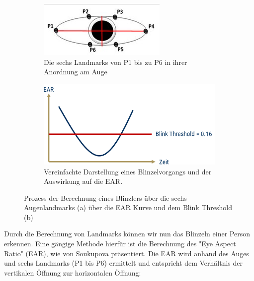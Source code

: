 \begin{figure}
    \centering
    \begin{subfigure}{0.45\textwidth}
        \includegraphics[width=\linewidth]{images/EyeLandmarks.jpg}
        \caption{Die sechs Landmarks von P1 bis zu P6 in ihrer Anordnung am Auge \cite{DE22}}
        \label{fig:eyelandmarks}
    \end{subfigure}
    \hfill
    \begin{subfigure}{0.45\textwidth}
        \includegraphics[width=\linewidth]{images/EARCurve.png}
        \caption{Vereinfachte Darstellung eines Blinzelvorgangs und der Auswirkung auf die EAR.}
        \label{fig:earcurve}
    \end{subfigure}
    \caption{Prozess der Berechnung eines Blinzlers über die sechs Augenlandmarks (a) über die EAR Kurve und dem Blink Threshold (b)}
    \label{fig:eyeaspectratio}
\end{figure}

Durch die Berechnung von Landmarks können wir nun das Blinzeln einer Person erkennen. Eine gängige Methode hierfür ist die Berechnung des "Eye Aspect Ratio" (EAR), wie von Soukupova \cite{SO16} präsentiert. Die EAR wird anhand des Auges und sechs Landmarks (P1 bis P6) ermittelt und entspricht dem Verhältnis der vertikalen Öffnung zur horizontalen Öffnung:

